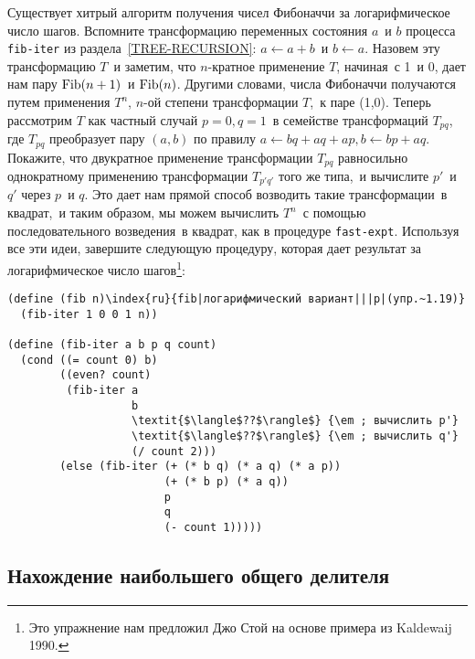 \begin{exercise}{1.19}\label{EX1.19}%
Существует хитрый алгоритм получения чисел Фибоначчи за
логарифмическое число шагов.  Вспомните трансформацию переменных
состояния $a$~и $b$ процесса
{\tt fib-iter} из раздела~\ref{TREE-RECURSION}:
$a \gets a+b$~и $b \gets a$. Назовем эту
трансформацию $T$~и заметим, что $n$-кратное
применение $T$, начиная~с 1~и 0, дает нам пару
$\mathop{\rm Fib}(n+1)$~и $\mathop{\rm Fib}(n)$.
Другими словами, числа Фибоначчи получаются путем применения
$T^n$, $n$-ой степени трансформации $T$,~к паре (1,0).
Теперь рассмотрим $T$ как частный случай $p = 0, q =
1$~в семействе трансформаций $T_{pq}$, где
$T_{pq}$ преобразует пару $(a,b)$ по правилу
$a \gets bq + aq + ap, b \gets bp + aq$. Покажите, что
двукратное применение трансформации $T_{pq}$ равносильно
однократному применению трансформации $T_{p'q'}$ того же
типа,~и вычислите $p'$~и $q'$ через
$p$~и $q$. Это дает нам прямой способ возводить
такие трансформации~в квадрат,~и таким образом, мы можем вычислить 
$T^n$~с помощью последовательного возведения~в квадрат, как 
в процедуре {\tt fast-expt}.  Используя все эти идеи,
завершите следующую процедуру, которая дает результат за
логарифмическое число шагов\footnote{Это упражнение нам предложил Джо Стой%
на основе примера из Kaldewaij 1990.%
}:

\begin{Verbatim}
(define (fib n)\index{ru}{fib|логарифмический вариант|||p|(упр.~1.19)}
  (fib-iter 1 0 0 1 n))

(define (fib-iter a b p q count)
  (cond ((= count 0) b)
        ((even? count)
         (fib-iter a
                   b
                   \textit{$\langle$??$\rangle$} {\em ; вычислить p'}
                   \textit{$\langle$??$\rangle$} {\em ; вычислить q'}
                   (/ count 2)))
        (else (fib-iter (+ (* b q) (* a q) (* a p))
                        (+ (* b p) (* a q))
                        p
                        q
                        (- count 1)))))
\end{Verbatim}

\end{exercise}

\subsection{Нахождение наибольшего общего делителя}
\label{GREATEST-COMMON-DIVISORS}



